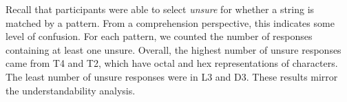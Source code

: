 
Recall that participants were able to select \emph{unsure} for whether a string is matched  by a pattern. 
From a comprehension perspective, this indicates some level of confusion. 
For each pattern, we counted the number of responses containing at least one unsure.
Overall, the highest number of unsure responses came from T4 and T2, which have octal and hex representations of characters. The least number of unsure responses were in L3 and D3.
These results mirror the understandability analysis.%


